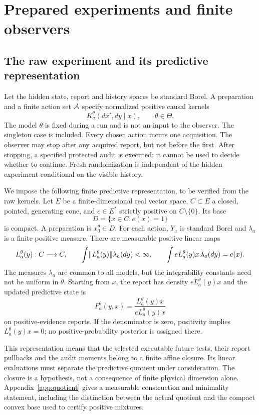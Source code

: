 \section{Prepared experiments and finite observers}\label{sec:experiments}
\subsection{The raw experiment and its predictive representation}
Let the hidden state, report and history spaces be standard Borel. A preparation and a finite action set $\mathcal A$ specify normalized positive causal kernels
\[
 K_a^\theta(dx',dy\mid x),\qquad \theta\in\Theta.
\]
The model $\theta$ is fixed during a run and is not an input to the observer. The singleton case is included. Every chosen action incurs one acquisition. The observer may stop after any acquired report, but not before the first. After stopping, a specified protected audit is executed: it cannot be used to decide whether to continue. Fresh randomization is independent of the hidden experiment conditional on the visible history.

We impose the following finite predictive representation, to be verified from the raw kernels. Let $E$ be a finite-dimensional real vector space, $C\subset E$ a closed, pointed, generating cone, and $e\in E^*$ strictly positive on $C\setminus\{0\}$. Its base
\[
 D=\{x\in C:e(x)=1\}
\]
is compact. A preparation is $x_0^\theta\in D$. For each action, $Y_a$ is standard Borel and $\lambda_a$ is a finite positive measure. There are measurable positive linear maps
\begin{equation}\label{eq:raw-instrument}
 L_a^\theta(y):C\longrightarrow C,\qquad
 \int\lVert L_a^\theta(y)\rVert\lambda_a(dy)<\infty,
 \qquad \int eL_a^\theta(y)x\,\lambda_a(dy)=e(x).
\end{equation}
The measures $\lambda_a$ are common to all models, but the integrability constants need not be uniform in $\theta$. Starting from $x$, the report has density $eL_a^\theta(y)x$ and the updated predictive state is
\begin{equation}\label{eq:update}
 F_a^\theta(y,x)=\frac{L_a^\theta(y)x}{eL_a^\theta(y)x}
\end{equation}
on positive-evidence reports. If the denominator is zero, positivity implies $L_a^\theta(y)x=0$; no positive-probability posterior is assigned there.

This representation means that the selected executable future tests, their report pullbacks and the audit moments belong to a finite affine closure. Its linear evaluations must separate the predictive quotient under consideration. The closure is a hypothesis, not a consequence of finite physical dimension alone. Appendix~\ref{app:quotient} gives a measurable construction and minimality statement, including the distinction between the actual quotient and the compact convex base used to certify positive mixtures.

